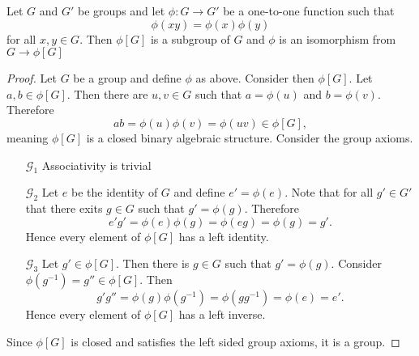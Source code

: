 \documentclass[../notes.tex]{subfiles}
\begin{document}
\begin{lemma}
	\label{lem:imageisomorphism}
	Let $G$ and $G'$ be groups and let $\phi : G \to G'$ be a one-to-one function such that 
	\[
		\phi(xy) = \phi(x) \phi(y)
	\]
	for all $x,y \in G$. Then $\phi[G]$ is a subgroup of $G$ and $\phi$ is an isomorphism from $G \to \phi[G]$
\end{lemma}
\begin{proof}
	Let $G$ be a group and define $\phi$ as above. Consider then $\phi[G]$. Let $a,b \in \phi[G]$. Then there are $u,v \in G$ such that $a = \phi(u)$ and $b = \phi(v)$. Therefore
	\[
		ab = \phi(u)\phi(v) = \phi(uv) \in \phi[G]
	,\]
	meaning $\phi[G]$ is a closed binary algebraic structure. Consider the group axioms.
	\begin{enumerate}
		\item[$\mathcal{G}_1$] 
		Associativity is trivial
		\item[$\mathcal{G}_2$] 
		Let $e$ be the identity of $G$ and define $e' = \phi(e)$. Note that for all $g' \in G'$ that there exits $g \in G$ such that $g' = \phi(g)$. Therefore
		\[
			e' g' = \phi(e) \phi(g) = \phi(eg) = \phi(g) = g'
		.\]
		Hence every element of $\phi[G]$ has a left identity.
		\item[$\mathcal{G}_3$] 
			Let $g' \in \phi[G]$. Then there is $g \in G$ such that $g' = \phi(g)$. Consider $\phi(g^{-1}) = g'' \in \phi[G]$. Then
			\[
				g' g'' = \phi(g) \phi(g^{-1}) = \phi(g g^{-1}) = \phi(e) = e'
			.\]
			Hence every element of $\phi[G]$ has a left inverse.
	\end{enumerate}
	Since $\phi[G]$ is closed and satisfies the left sided group axioms, it is a group.
\end{proof}
\end{document}
